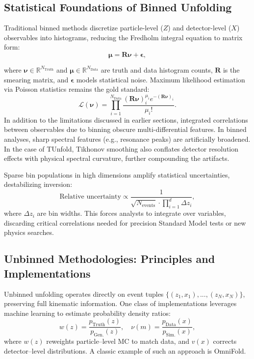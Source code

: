 \subsection{Statistical Foundations of Binned Unfolding}  
Traditional binned methods discretize particle-level (\(Z\)) and detector-level (\(X\)) observables into histograms, reducing the Fredholm integral equation to matrix form:
\begin{equation}
\boldsymbol{\mu} = \mathbf{R}\boldsymbol{\nu} + \boldsymbol{\epsilon},
\end{equation}

where \(\boldsymbol{\nu} \in \mathbb{R}^{N_{\text{Truth}}}\) and \(\boldsymbol{\mu} \in \mathbb{R}^{N_{\text{Data}}}\) are truth and data histogram counts, \(\mathbf{R}\) is the smearing matrix, and \(\boldsymbol{\epsilon}\) models statistical noise. Maximum likelihood estimation via Poisson statistics remains the gold standard:
\begin{equation}
\mathcal{L}(\boldsymbol{\nu}) = \prod_{i=1}^{N_{\text{Data}}} \frac{(\mathbf{R}\boldsymbol{\nu})_i^{\mu_i} e^{-(\mathbf{R}\boldsymbol{\nu})_i}}{\mu_i!}.
\end{equation}
In addition to the limitations discussed in earlier sections, integrated correlations between observables due to binning obscure multi-differential features.
%
In binned analyses, sharp spectral features (e.g., resonance peaks) are artificially broadened.
%
In the case of TUnfold, Tikhonov smoothing also conflates detector resolution effects with physical spectral curvature, further compounding the artifacts.

Sparse bin populations in high dimensions amplify statistical uncertainties, destabilizing inversion:
\begin{equation}
\text{Relative uncertainty} \propto \frac{1}{\sqrt{N_{\text{events}}} \cdot \prod_{i=1}^d \Delta z_i},
\end{equation}
where \(\Delta z_i\) are bin widths.
%
This forces analysts to integrate over variables, discarding critical correlations needed for precision Standard Model tests or new physics searches.

\subsection{Unbinned Methodologies: Principles and Implementations}  
Unbinned unfolding operates directly on event tuples \(\{(z_1, x_1), ..., (z_N, x_N)\}\), preserving full kinematic information.
%
One class of implementations leverages machine learning to estimate probability density ratios:
\begin{equation}
w(z) = \frac{p_{\text{Truth}}(z)}{p_{\text{Gen.}}(z)}, \quad \nu(m) = \frac{p_{\text{Data}}(x)}{p_{\text{Sim.}}(x)},
\end{equation}
where \(w(z)\) reweights particle--level MC to match data, and \(v(x)\) corrects detector--level distributions.
%
A classic example of such an approach is OmniFold.

